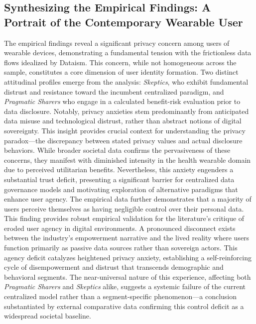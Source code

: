 \subsection{Synthesizing the Empirical Findings: A Portrait of the Contemporary Wearable User}
	The empirical findings reveal a significant privacy concern among users of wearable devices, demonstrating a fundamental tension with the frictionless data flows idealized by Dataism. This concern, while not homogeneous across the sample, constitutes a core dimension of user identity formation. Two distinct attitudinal profiles emerge from the analysis: \textit{Skeptics}, who exhibit fundamental distrust and resistance toward the incumbent centralized paradigm, and \textit{Pragmatic Sharers} who engage in a calculated benefit-risk evaluation prior to data disclosure. Notably, privacy anxieties stem predominantly from anticipated data misuse and technological distrust, rather than abstract notions of digital sovereignty. This insight provides crucial context for understanding the privacy paradox—the discrepancy between stated privacy values and actual disclosure behaviors. While broader societal data confirms the pervasiveness of these concerns, they manifest with diminished intensity in the health wearable domain due to perceived utilitarian benefits. Nevertheless, this anxiety engenders a substantial trust deficit, presenting a significant barrier for centralized data governance models and motivating exploration of alternative paradigms that enhance user agency.
	The empirical data further demonstrates that a majority of users perceive themselves as having negligible control over their personal data. This finding provides robust empirical validation for the literature's critique of eroded user agency in digital environments. A pronounced disconnect exists between the industry's empowerment narrative and the lived reality where users function primarily as passive data sources rather than sovereign actors. This agency deficit catalyzes heightened privacy anxiety, establishing a self-reinforcing cycle of disempowerment and distrust that transcends demographic and behavioral segments. The near-universal nature of this experience, affecting both \textit{Pragmatic Sharers} and \textit{Skeptics} alike, suggests a systemic failure of the current centralized model rather than a segment-specific phenomenon—a conclusion substantiated by external comparative data confirming this control deficit as a widespread societal baseline.
